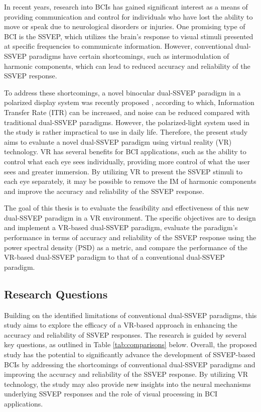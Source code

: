 In recent years, research into BCIs has gained significant interest as a means of providing communication and control for individuals who have lost the ability to move or speak due to neurological disorders or injuries. One promising type of BCI is the SSVEP, which utilizes the brain's response to visual stimuli presented at specific frequencies to communicate information. However, conventional dual-SSVEP paradigms have certain shortcomings, such as intermodulation of harmonic components, which can lead to reduced accuracy and reliability of the SSVEP response.

To address these shortcomings, a novel binocular dual-SSVEP paradigm in a polarized display system was recently proposed \cite{sun2023binocular}, according to which, Information Transfer Rate (ITR) can be increased, and noise can be reduced compared with traditional dual-SSVEP paradigms. However, the polarized-light system used in the study is rather impractical to use in daily life. Therefore, the present study aims to evaluate a novel dual-SSVEP paradigm using virtual reality (VR) technology. VR has several benefits for BCI applications, such as the ability to control what each eye sees individually, providing more control of what the user sees and greater immersion. By utilizing VR to present the SSVEP stimuli to each eye separately, it may be possible to remove the IM of harmonic components and improve the accuracy and reliability of the SSVEP response.

The goal of this thesis is to evaluate the feasibility and effectiveness of this new dual-SSVEP paradigm in a VR environment. The specific objectives are to design and implement a VR-based dual-SSVEP paradigm, evaluate the paradigm's performance in terms of accuracy and reliability of the SSVEP response using the power spectral density (PSD) as a metric, and compare the performance of the VR-based dual-SSVEP paradigm to that of a conventional dual-SSVEP paradigm.

\subsection{Research Questions}

Building on the identified limitations of conventional dual-SSVEP paradigms, this study aims to explore the efficacy of a VR-based approach in enhancing the accuracy and reliability of SSVEP responses.
The research is guided by several key questions, as outlined in Table \ref{tab:comparisons} below. Overall, the proposed study has the potential to significantly advance the development of SSVEP-based BCIs by addressing the shortcomings of conventional dual-SSVEP paradigms and improving the accuracy and reliability of the SSVEP response. By utilizing VR technology, the study may also provide new insights into the neural mechanisms underlying SSVEP responses and the role of visual processing in BCI applications.

